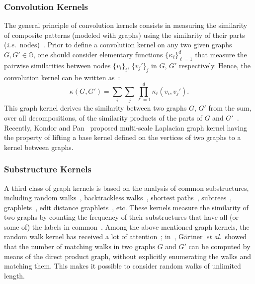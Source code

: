 \documentclass[journal]{IEEEtran}
\theoremstyle{definition}
\newcommand{\etal}{\textit{et al.}}
\newcommand{\ie}{\textit{i.e.}}
\begin{document}
\subsubsection{Convolution Kernels}
The general principle of convolution kernels consists in measuring the similarity of composite patterns (modeled with graphs) using the similarity of their parts (\ie~nodes)~\cite{Watkins1999}. Prior to define a convolution kernel on any two given graphs $G,G' \in \mathbb{G}$, one should consider elementary functions $\{\kappa_\ell\}_{\ell=1}^d$ that measure the pairwise similarities between nodes $\lbrace v_i\rbrace_{i}$, $\lbrace v_j'\rbrace_{j}$ in $G$, $G'$ respectively. Hence, the convolution kernel can be written as~\cite{Neuhaus2007}:
\begin{equation*}
\kappa(G,G')=\sum_{i}\sum_{j}\prod_{\ell=1}^d \kappa_\ell(v_i,v_j').
\end{equation*}
This graph kernel derives the similarity between two graphs $G$, $G'$ from the sum, over all decompositions, of the similarity products of the parts of $G$ and $G'$~\cite{Neuhaus2007}. Recently, Kondor and Pan~\cite{Kondor2016} proposed multi-scale Laplacian graph kernel having the property of lifting a base kernel defined on the vertices of two graphs to a kernel between graphs.

\subsubsection{Substructure Kernels}

A third class of graph kernels is based on the analysis of common substructures, including random walks~\cite{Vishwanathan2010}, backtrackless walks~\cite{Aziz2013}, shortest paths~\cite{Borgwardt2005}, subtrees~\cite{Shervashidze2009a}, graphlets~\cite{Shervashidze2009}, edit distance graphlets~\cite{Lugo-Martinez2014}, etc. These kernels measure the similarity of two graphs by counting the frequency of their substructures that have all (or some of) the labels in common~\cite{Borgwardt2005}. Among the above mentioned graph kernels, the random walk kernel has received a lot of attention~\cite{Gartner2003,Vishwanathan2010}; in~\cite{Gartner2003}, G\"{a}rtner~\etal~showed that the number of matching walks in two graphs $G$ and $G'$ can be computed by means of the direct product graph, without explicitly enumerating the walks and matching them. This makes it possible to consider random walks of unlimited length.
 
\end{document}
